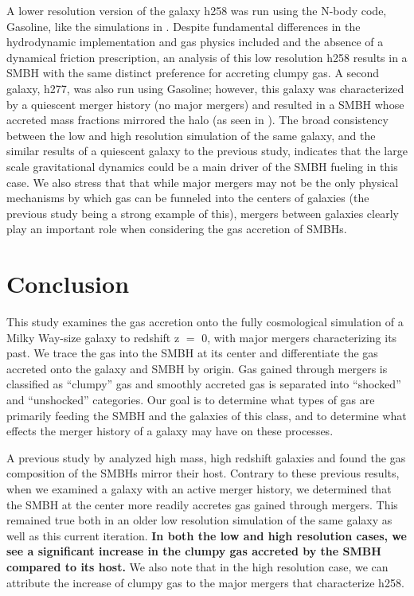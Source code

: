 \documentclass[]{emulateapj}
\begin{document}
A lower resolution version of the galaxy h258 was run using the N-body code, Gasoline, like the simulations in \cite{Bellovary2013}. Despite fundamental differences in the hydrodynamic implementation and gas physics included and the absence of a dynamical friction prescription, an analysis of this low resolution h258 results in a SMBH with the same distinct preference for accreting clumpy gas. A second galaxy, h277, was also run using Gasoline; however, this galaxy was characterized by a quiescent merger history (no major mergers) and resulted in a SMBH whose accreted mass fractions mirrored the halo (as seen in \cite{Bellovary2013}). The broad consistency between the low and high resolution simulation of the same galaxy, and the similar results of a quiescent galaxy to the previous study, indicates that the large scale gravitational dynamics could be a main driver of the SMBH fueling in this case. We also stress that that while major mergers may not be the only physical mechanisms by which gas can be funneled into the centers of galaxies (the previous study being a strong example of this), mergers between galaxies clearly play an important role when considering the gas accretion of SMBHs.




\section{Conclusion}
This study examines the gas accretion onto the fully cosmological simulation of a Milky Way-size galaxy to redshift z $=$ 0, with major mergers characterizing its past. We trace the gas into the SMBH at its center and differentiate the gas accreted onto the galaxy and SMBH by origin. Gas gained through mergers is classified as ``clumpy'' gas and smoothly accreted gas is separated into ``shocked'' and ``unshocked'' categories. Our goal is to determine what types of gas are primarily feeding the SMBH and the galaxies of this class, and to determine what effects the merger history of a galaxy may have on these processes.

A previous study by \cite{Bellovary2013} analyzed high mass, high redshift galaxies and found the gas composition of the SMBHs mirror their host. Contrary to these previous results, when we examined a galaxy with an active merger history, we determined that the SMBH at the center more readily accretes gas gained through mergers. This remained true both in an older low resolution simulation of the same galaxy as well as this current iteration. \textbf{In both the low and high resolution cases, we see a significant increase in the clumpy gas accreted by the SMBH compared to its host.} We also note that in the high resolution case, we can attribute the increase of clumpy gas to the major mergers that characterize h258. 
\end{document}
